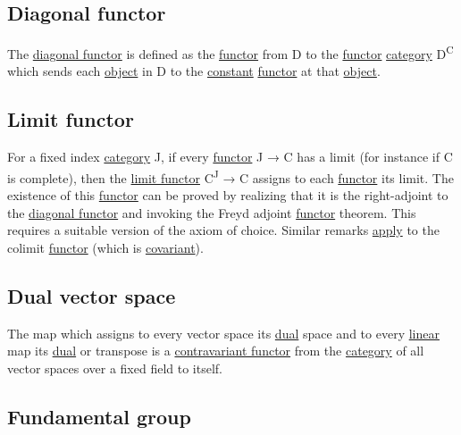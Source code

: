 \documentclass[11pt]{article}
\begin{document}
\subsection{\label{org884f2d0}Diagonal functor}
\label{sec:orga924b6d}

The \hyperref[org884f2d0]{diagonal functor} is defined as the \hyperref[org6073683]{functor} from D to the \hyperref[org6073683]{functor} \hyperref[org3e3a79b]{category} D\textsuperscript{C} which sends each \hyperref[org025aac8]{object} in D to the \hyperref[org6cc4f99]{constant} \hyperref[org6073683]{functor} at that \hyperref[org025aac8]{object}.\\

\subsection{\label{orgec6f81c}Limit functor}
\label{sec:org18aa03c}

For a fixed index \hyperref[org3e3a79b]{category} J, if every \hyperref[org6073683]{functor} J → C has a limit (for instance if C is complete), then the \hyperref[orgec6f81c]{limit functor} C\textsuperscript{J} → C assigns to each \hyperref[org6073683]{functor} its limit. The existence of this \hyperref[org6073683]{functor} can be proved by realizing that it is the right-adjoint to the \hyperref[org884f2d0]{diagonal functor} and invoking the Freyd adjoint \hyperref[org6073683]{functor} theorem. This requires a suitable version of the axiom of choice. Similar remarks \hyperref[orgfed746a]{apply} to the colimit \hyperref[org6073683]{functor} (which is \hyperref[orgf529c7b]{covariant}).\\

\subsection{\label{orgc179b01}Dual vector space}
\label{sec:org31f5e4c}

The map which assigns to every vector space its \hyperref[org0a6da4c]{dual} space and to every \hyperref[orgb55e183]{linear} map its \hyperref[org0a6da4c]{dual} or transpose is a \hyperref[org4f18281]{contravariant functor} from the \hyperref[org3e3a79b]{category} of all vector spaces over a fixed field to itself.\\

\subsection{\label{org0b73b5f}Fundamental group}
\label{sec:orgcc8d1f1}
\end{document}
